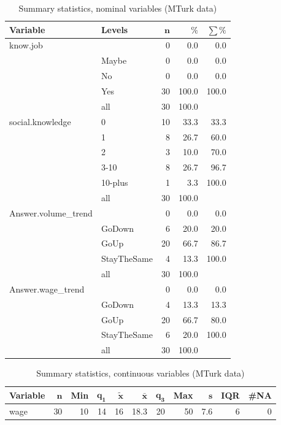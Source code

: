 \documentclass[a4paper,10pt]{article}\usepackage[]{graphicx}\usepackage[]{color}
\begin{document}
\begin{table}[ht]
\centering
{\footnotesize
\begin{tabular}{ll|rrr}
 \textbf{Variable} & \textbf{Levels} & $\mathbf{n}$ & $\mathbf{\%}$ & $\mathbf{\sum \%}$ \\ 
  \hline
know.job &  & 0 & 0.0 & 0.0 \\ 
   & Maybe & 0 & 0.0 & 0.0 \\ 
   & No & 0 & 0.0 & 0.0 \\ 
   & Yes & 30 & 100.0 & 100.0 \\ 
   \hline
 & all & 30 & 100.0 &  \\ 
   \hline
\hline
social.knowledge & 0 & 10 & 33.3 & 33.3 \\ 
   & 1 & 8 & 26.7 & 60.0 \\ 
   & 2 & 3 & 10.0 & 70.0 \\ 
   & 3-10 & 8 & 26.7 & 96.7 \\ 
   & 10-plus & 1 & 3.3 & 100.0 \\ 
   \hline
 & all & 30 & 100.0 &  \\ 
   \hline
\hline
Answer.volume\_trend &  & 0 & 0.0 & 0.0 \\ 
   & GoDown & 6 & 20.0 & 20.0 \\ 
   & GoUp & 20 & 66.7 & 86.7 \\ 
   & StayTheSame & 4 & 13.3 & 100.0 \\ 
   \hline
 & all & 30 & 100.0 &  \\ 
   \hline
\hline
Answer.wage\_trend &  & 0 & 0.0 & 0.0 \\ 
   & GoDown & 4 & 13.3 & 13.3 \\ 
   & GoUp & 20 & 66.7 & 80.0 \\ 
   & StayTheSame & 6 & 20.0 & 100.0 \\ 
   \hline
 & all & 30 & 100.0 &  \\ 
   \hline
\hline
\end{tabular}
}
\caption{Summary statistics, nominal variables (MTurk data)} 
\label{tab1:25-2010}
\end{table}
\begin{table}[ht]
\centering
{\footnotesize
\begin{tabular}{lrrrrrrrrrr}
 \textbf{Variable} & $\mathbf{n}$ & \textbf{Min} & $\mathbf{q_1}$ & $\mathbf{\widetilde{x}}$ & $\mathbf{\bar{x}}$ & $\mathbf{q_3}$ & \textbf{Max} & $\mathbf{s}$ & \textbf{IQR} & \textbf{\#NA} \\ 
  \hline
wage & 30 & 10 & 14 & 16 & 18.3 & 20 & 50 & 7.6 & 6 & 0 \\ 
  \end{tabular}
}
\caption{Summary statistics, continuous variables (MTurk data)} 
\label{tab2:25-2010}
\end{table}
\end{document}

